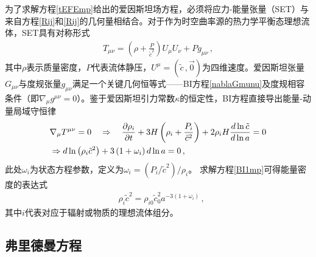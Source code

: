 \documentclass[jkps,preprint,fleqn]{revtex4}
\newcommand{\tc}{\tilde{c}}
\begin{document}
为了求解方程\eqref{tEFEmp}给出的爱因斯坦场方程，必须将应力-能量张量（SET）与来自方程\eqref{Rij}和\eqref{Rij}的几何量相结合。对于作为时空曲率源的热力学平衡态理想流体，SET具有对称形式
\begin{align} T_{\mu\nu} = \left( \rho + \frac{P}{\tc^2} \right) U_{\mu} U_{\nu} + P g_{\mu\nu} \label{Tmunump} \,, \end{align}
其中$\rho$表示质量密度，$P$代表流体静压，$U^{\mu} = (\tc\,,\vec{0})$为四维速度。爱因斯坦张量$G_{\mu\nu}$与度规张量$g_{\mu\nu}$满足一个关键几何恒等式——BI方程\eqref{nablaGmunu}及度规相容条件（即$\nabla_{\mu} g^{\mu\nu} = 0$）。鉴于爱因斯坦引力常数$\kappa$的恒定性，BI方程直接导出能量-动量局域守恒律
\begin{align} &\nabla_{\mu} \tensor{T}{^\mu^\nu} = 0 \quad \Rightarrow \quad \frac{\partial \rho_i}{\partial t} + 3 H \left( \rho_i + \frac{P_i}{\tc^2} \right) + 2 \rho_i H \frac{d \ln \tc}{d \ln a} = 0 \nonumber \\ &\Rightarrow d \ln \left( \rho_i \tc^2 \right) + 3 \left( 1 + \omega_i \right) d \ln a = 0 \label{BI1mp} \,, \end{align}
此处$\omega_i$为状态方程参数，定义为$\omega_i = (P_i/\tc^2)/\rho_i$。
求解方程\eqref{BI1mp}可得能量密度的表达式
\begin{align} &\rho_i \tc^{2} = \rho_{i0} \tc_0^2 a^{-3 (1 + \omega_i)} \label{rhomp} \,,\end{align}
其中$i$代表对应于辐射或物质的理想流体组分。
\subsection{弗里德曼方程}\label{subsec:FE}
\end{document}

